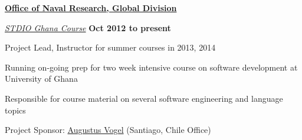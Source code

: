 \documentclass[10pt]{article}
\newenvironment{outerlist}[1][\enskip\textbullet]%
        {\begin{itemize}[#1]}{\end{itemize}%
         \vspace{-.6\baselineskip}}
\newenvironment{innerlist}[1][\enskip\textbullet]%
        {\begin{compactitem}[#1]}{\end{compactitem}}
\begin{document}
\href{http://www.onr.navy.mil/Science-technology/onr-global.aspx}{\textbf{Office of Naval Research, Global Division}}
\begin{outerlist}

\item[] \textit{\href{http://stdio-ghana.github.io/}{STDIO Ghana Course}}%
    \hfill \textbf{Oct 2012 to present}
    \begin{innerlist}
        \item Project Lead, Instructor for summer courses in 2013, 2014
        \begin{innerlist}
            \item Running on-going prep for two week intensive course on software development at University of Ghana
            \item Responsible for course material on several software engineering and language topics
            \item Project Sponsor: \href{mailto:vogela@onr.navy.mil }{Augustus Vogel} (Santiago, Chile Office)
        \end{innerlist}
    \end{innerlist}
\end{outerlist}~
\end{document}

